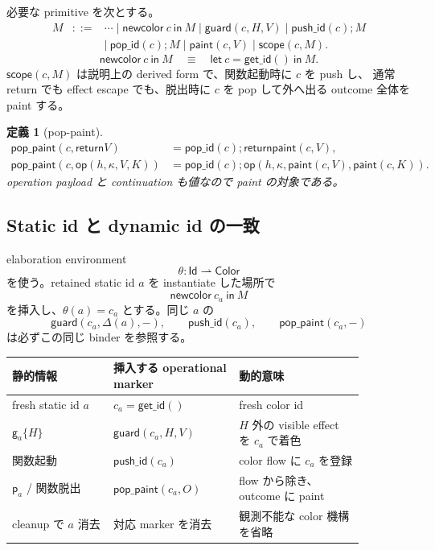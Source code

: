 \documentclass[uplatex,dvipdfmx,a4paper,11pt]{jsarticle}
\theoremstyle{jpplain}
\newtheorem{definition}{定義}[section]
\newcommand{\Id}{\mathsf{Id}}
\newcommand{\Color}{\mathsf{Color}}
\newcommand{\gatom}[2]{\mathsf g_{#1}\!\{#2\}}
\newcommand{\patom}[1]{\mathsf p_{#1}}
\newcommand{\colors}{\kappa}
\newcommand{\ret}{\mathsf{return}}
\newcommand{\oper}{\mathsf{op}}
\newcommand{\scope}{\mathsf{scope}}
\newcommand{\getid}{\mathsf{get\_id}}
\newcommand{\pushid}{\mathsf{push\_id}}
\newcommand{\popid}{\mathsf{pop\_id}}
\newcommand{\guard}{\mathsf{guard}}
\newcommand{\paint}{\mathsf{paint}}
\newcommand{\poppaint}{\mathsf{pop\_paint}}
\begin{document}
必要な primitive を次とする。
\[
\begin{array}{rcl}
 M &::=& \cdots
 \mid \mathsf{newcolor}\ c\ \mathsf{in}\ M
 \mid \guard(c,H,V)
 \mid \pushid(c);M\\
 &&\mid\ \popid(c);M
 \mid \paint(c,V)
 \mid \scope(c,M).
\end{array}
\]
\[
  \mathsf{newcolor}\ c\ \mathsf{in}\ M
  \quad\equiv\quad
  \mathsf{let}\ c=\getid()\ \mathsf{in}\ M.
\]
$\scope(c,M)$ は説明上の derived form で、関数起動時に $c$ を push し、
通常 return でも effect escape でも、脱出時に $c$ を pop して外へ出る outcome 全体を paint する。

\begin{definition}[pop-paint]
\[
\begin{aligned}
 \poppaint(c,\ret V)
   &= \popid(c);\ret\paint(c,V),\\
 \poppaint(c,\oper(h,\colors,V,K))
   &= \popid(c);\oper(h,\colors,\paint(c,V),\paint(c,K)).
\end{aligned}
\]
operation payload と continuation も値なので paint の対象である。
\end{definition}

\subsection{Static id と dynamic id の一致}

elaboration environment
\[
  \theta:\Id\rightharpoonup\Color
\]
を使う。retained static id $a$ を instantiate した場所で
\[
  \mathsf{newcolor}\ c_a\ \mathsf{in}\ M
\]
を挿入し、$\theta(a)=c_a$ とする。同じ $a$ の
\[
 \guard(c_a,\Delta(a),-),\qquad
 \pushid(c_a),\qquad
 \poppaint(c_a,-)
\]
は必ずこの同じ binder を参照する。

\begin{formalbox}[title={Elaboration correspondence},fonttitle=\bfseries]
\begin{center}
\begin{tabular}{>{\raggedright\arraybackslash}p{0.25\linewidth}p{0.31\linewidth}p{0.31\linewidth}}
\toprule
静的情報 & 挿入する operational marker & 動的意味 \\
\midrule
fresh static id $a$ & $c_a=\getid()$ & fresh color id \\
$\gatom aH$ & $\guard(c_a,H,V)$ & $H$ 外の visible effect を $c_a$ で着色 \\
関数起動 & $\pushid(c_a)$ & color flow に $c_a$ を登録 \\
$\patom a$ / 関数脱出 & $\poppaint(c_a,O)$ & flow から除き、outcome に paint \\
cleanup で $a$ 消去 & 対応 marker を消去 & 観測不能な color 機構を省略 \\
\bottomrule
\end{tabular}
\end{center}
\end{formalbox}
\end{document}
